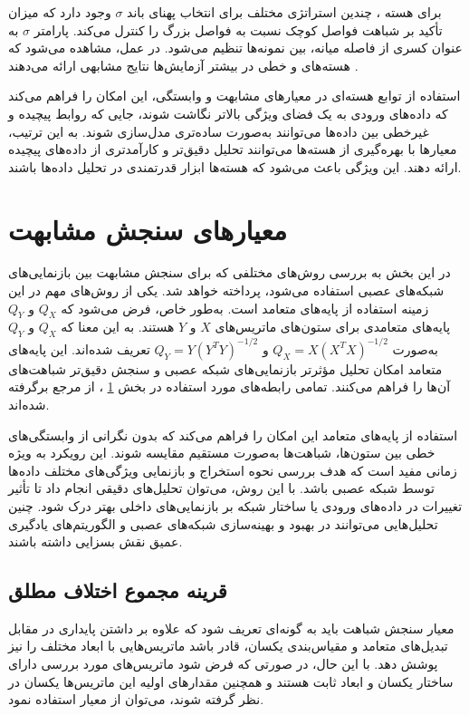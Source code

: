 برای هسته
%
، چندین استراتژی مختلف برای انتخاب پهنای باند \(\sigma\) وجود دارد که میزان تأکید بر شباهت فواصل کوچک نسبت به فواصل بزرگ را کنترل می‌کند. پارامتر \(\sigma\) به عنوان کسری از فاصله میانه، بین نمونه‌ها تنظیم می‌شود. در عمل، مشاهده می‌شود که هسته‌های
و خطی در بیشتر آزمایش‌ها نتایج مشابهی ارائه می‌دهند
\cite{kornblith2019similarity}.

استفاده از توابع هسته‌ای در معیارهای مشابهت و وابستگی، این امکان را فراهم می‌کند که داده‌های ورودی به یک فضای ویژگی بالاتر نگاشت شوند، جایی که روابط پیچیده و غیرخطی بین داده‌ها می‌توانند به‌صورت ساده‌تری مدل‌سازی شوند. به این ترتیب، معیارها با بهره‌گیری از هسته‌ها می‌توانند تحلیل دقیق‌تر و کارآمدتری از داده‌های پیچیده ارائه دهند. این ویژگی باعث می‌شود که هسته‌ها ابزار قدرتمندی در تحلیل داده‌ها باشند.



\section{
	معیار‌های سنجش مشابهت
}\label{sec_similarity_measurement_criteria}
در این بخش به بررسی روش‌های مختلفی که برای سنجش مشابهت بین بازنمایی‌های شبکه‌های عصبی استفاده می‌شود، پرداخته خواهد شد. یکی از روش‌های مهم در این زمینه استفاده از پایه‌های متعامد است. به‌طور خاص، فرض می‌شود که \( Q_X \) و \( Q_Y \) پایه‌های متعامدی برای ستون‌های ماتریس‌های \( X \) و \( Y \) هستند. به این معنا که \( Q_X \) و \( Q_Y \) به‌صورت \( Q_X = X(X^T X)^{-1/2} \) و \( Q_Y = Y(Y^T Y)^{-1/2} \) تعریف شده‌اند. این پایه‌های متعامد امکان تحلیل مؤثرتر بازنمایی‌های شبکه عصبی و سنجش دقیق‌تر شباهت‌های آن‌ها را فراهم می‌کنند.
تمامی رابطه‌های مورد استفاده در بخش
\ref{sec_similarity_measurement_criteria}%
، از مرجع 
\cite{kornblith2019similarity} 
برگرفته شده‌اند.


استفاده از پایه‌های متعامد این امکان را فراهم می‌کند که بدون نگرانی از وابستگی‌های خطی بین ستون‌ها، شباهت‌ها به‌صورت مستقیم مقایسه شوند. این رویکرد به ویژه زمانی مفید است که هدف بررسی نحوه استخراج و بازنمایی ویژگی‌های مختلف داده‌ها توسط شبکه عصبی باشد. با این روش، می‌توان تحلیل‌های دقیقی انجام داد تا تأثیر تغییرات در داده‌های ورودی یا ساختار شبکه بر بازنمایی‌های داخلی بهتر درک شود. چنین تحلیل‌هایی می‌توانند در بهبود و بهینه‌سازی شبکه‌های عصبی و الگوریتم‌های یادگیری عمیق نقش بسزایی داشته باشند.


\subsection{
	قرینه مجموع اختلاف مطلق%
}
معیار سنجش شباهت باید به گونه‌ای تعریف شود که علاوه بر داشتن پایداری در مقابل تبدیل‌های متعامد و مقیاس‌بندی یکسان، قادر باشد ماتریس‌هایی با ابعاد مختلف را نیز پوشش دهد. با این حال، در صورتی که فرض شود ماتریس‌های مورد بررسی دارای ساختار یکسان و ابعاد ثابت هستند و همچنین مقدار‌های اولیه این ماتریس‌ها یکسان در نظر گرفته شوند، می‌توان از معیار
استفاده نمود.

